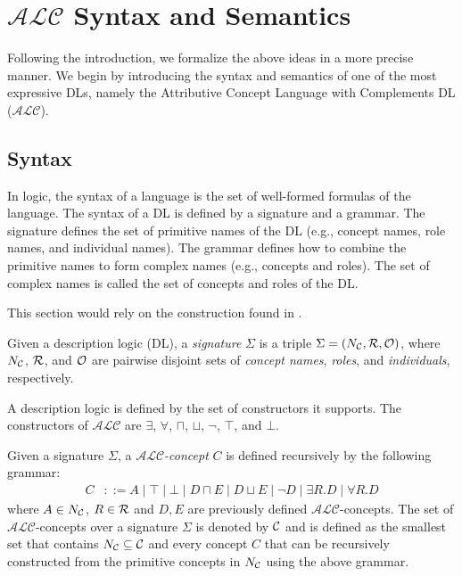 \section{$\mathcal{ALC}$ Syntax and Semantics}
\label{appendixB:section:dl_syntax_semantics}

Following the introduction, we formalize the above ideas in a more precise manner.
We begin by introducing the syntax and semantics of one of the most expressive DLs, namely the Attributive Concept Language with Complements DL ($\mathcal{ALC}$).

\subsection{Syntax}
\label{dl_syntax_semantics:subsection:dl_syntax}

In logic, the syntax of a language is the set of well-formed formulas of the language.
The syntax of a DL is defined by a signature and a grammar.
The signature defines the set of primitive names of the DL (e.g., concept names, role names, and individual names). 
The grammar defines how to combine the primitive names to form complex names (e.g., concepts and roles).
The set of complex names is called the set of concepts and roles of the DL.

This section would rely on the construction found in \cite{DLhandbook}.

\begin{definition}[Signature]
    Given a description logic (DL), a
     \emph{signature} $\Sigma$ is a triple $\Sigma = (N_{\mathcal{C}}, \mathcal{R}, \mathcal{O})$,
    where $N_{\mathcal{C}}$, $\mathcal{R}$, and $\mathcal{O}$ are pairwise disjoint sets of \emph{concept names}, \emph{roles}, and \emph{individuals}, respectively.
\end{definition}

A description logic is defined by the set of constructors it supports.
The constructors of $\mathcal{ALC}$ are $\exists$, $\forall$, $\sqcap$, $\sqcup$, $\neg$, $\top$, and $\bot$.

\begin{definition}
    Given a signature $\Sigma$, 
    a \emph{$\mathcal{ALC}$-concept} $C$ is defined recursively by the following grammar:
    \begin{align*}
        C &::= A \mid \top \mid \bot \mid D \sqcap E \mid D \sqcup E \mid \neg D \mid \exists R.D \mid \forall R.D
    \end{align*}
    where $A \in N_{\mathcal{C}}$, $R \in \mathcal{R}$ and $D, E$ are previously defined $\mathcal{ALC}$-concepts.
    The set of $\mathcal{ALC}$-concepts over a signature $\Sigma$ is denoted by $\mathcal{C}$ and is defined as the smallest 
    set that contains $N_{\mathcal{C}} \subseteq \mathcal{C}$ and every concept $C$ that can be recursively constructed 
    from the primitive concepts in $N_{\mathcal{C}}$ using the above grammar.
\end{definition}

